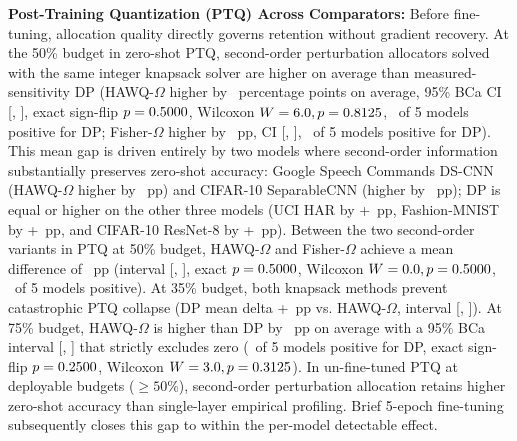 \documentclass{ieeeaccess}
\begin{document}
\textbf{Post-Training Quantization (PTQ) Across Comparators:} Before fine-tuning, allocation quality directly governs retention without gradient recovery. At the 50\% budget in zero-shot PTQ, second-order perturbation allocators solved with the same integer knapsack solver are higher on average than measured-sensitivity DP (HAWQ-$\Omega$ higher by \MacroPTQDPOmegaAbsMeanFifty\ percentage points on average, 95\% BCa CI [\MacroPTQDPOmegaCILowFifty, \MacroPTQDPOmegaCIHighFifty], exact sign-flip $p = 0.5000$, Wilcoxon $W = 6.0, p = 0.8125$, \MacroPTQDPOmegaWinsFifty\ of 5 models positive for DP; Fisher-$\Omega$ higher by \MacroPTQDPFisherAbsMeanFifty\ pp, CI [\MacroPTQDPFisherCILowFifty, \MacroPTQDPFisherCIHighFifty], \MacroPTQDPFisherWinsFifty\ of 5 models positive for DP). This mean gap is driven entirely by two models where second-order information substantially preserves zero-shot accuracy: Google Speech Commands DS-CNN (HAWQ-$\Omega$ higher by \MacroPTQOmegaAbsDeltaSpeech\ pp) and CIFAR-10 SeparableCNN (higher by \MacroPTQOmegaAbsDeltaSepCNN\ pp); DP is equal or higher on the other three models (UCI HAR by +\MacroPTQOmegaDeltaHAR\ pp, Fashion-MNIST by +\MacroPTQOmegaDeltaFMNIST\ pp, and CIFAR-10 ResNet-8 by +\MacroPTQOmegaDeltaResNet\ pp). Between the two second-order variants in PTQ at 50\% budget, HAWQ-$\Omega$ and Fisher-$\Omega$ achieve a mean difference of \MacroPTQOmegaFisherMeanFifty\ pp (interval [\MacroPTQOmegaFisherCILowFifty, \MacroPTQOmegaFisherCIHighFifty], exact $p = 0.5000$, Wilcoxon $W = 0.0, p = 0.5000$, \MacroPTQOmegaFisherWinsFifty\ of 5 models positive). At 35\% budget, both knapsack methods prevent catastrophic PTQ collapse (DP mean delta +\MacroPTQDPOmegaMeanThirtyFive\ pp vs. HAWQ-$\Omega$, interval [\MacroPTQDPOmegaCILowThirtyFive, \MacroPTQDPOmegaCIHighThirtyFive]). At 75\% budget, HAWQ-$\Omega$ is higher than DP by \MacroPTQDPOmegaAbsMeanSeventyFive\ pp on average with a 95\% BCa interval [\MacroPTQDPOmegaCILowSeventyFive, \MacroPTQDPOmegaCIHighSeventyFive] that strictly excludes zero (\MacroPTQDPOmegaWinsSeventyFive\ of 5 models positive for DP, exact sign-flip $p = 0.2500$, Wilcoxon $W = 3.0, p = 0.3125$). In un-fine-tuned PTQ at deployable budgets ($\ge 50\%$), second-order perturbation allocation retains higher zero-shot accuracy than single-layer empirical profiling. Brief 5-epoch fine-tuning subsequently closes this gap to within the per-model detectable effect.
\end{document}
